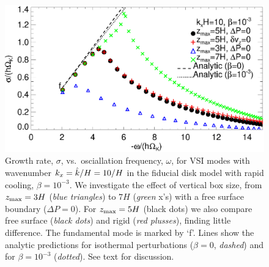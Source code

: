 

\begin{figure}
  \includegraphics[width=\linewidth]{figures/compare_modes_iso_kx10_analytic.ps}
  \caption{Growth rate, $\sigma$, vs.\ osciallation frequency, $\omega$, for
  VSI modes with wavenumber $k_x = \hat{k}/H=10/H$ in the fiducial disk model
    with rapid cooling, $\beta=10^{-3}$. %
We investigate the effect of vertical box size, from $z_\mathrm{max}=3H$
(\emph{blue triangles}) to $7H$ (\emph{green} x's)
    with a free surface boundary ($\Delta P=0$).  For $z_\mathrm{max}=5H$  (black dots) we also compare free surface (\emph{black dots}) and rigid (\emph{red plusses}), finding little difference.
      The fundamental mode is marked by `f'. Lines show the analytic predictions for
      isothermal perturbations ($\beta = 0$, \emph{dashed}) and for $\beta = 10^{-3}$ (\emph{dotted}).
      See text for discussion.
    \label{compare_modes_iso_kx10} 
  }
\end{figure}

